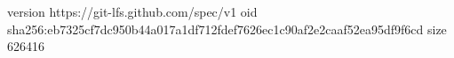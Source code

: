 version https://git-lfs.github.com/spec/v1
oid sha256:eb7325cf7dc950b44a017a1df712fdef7626ec1c90af2e2caaf52ea95df9f6cd
size 626416
